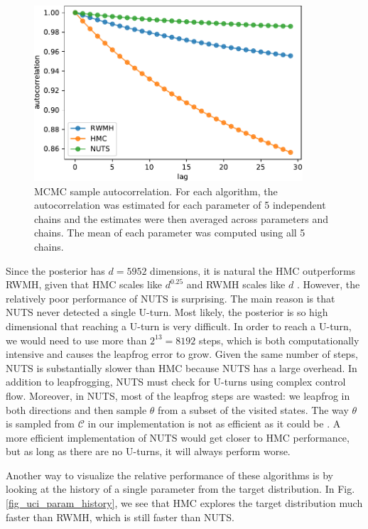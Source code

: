 \documentclass[12pt]{article}
\begin{document}
\begin{figure}[H]
\centering
\includegraphics[width=10cm]{plots/uci_param_autocor.pdf}
\caption{MCMC sample autocorrelation. For each algorithm, the autocorrelation was estimated for each parameter of 5 independent chains and the estimates were then averaged across parameters and chains. The mean of each parameter was computed using all 5 chains.}
\label{fig_uci_param_autocor}
\end{figure}

Since the posterior has $d=5952$ dimensions, it is natural the HMC outperforms RWMH, given that HMC scales like $d^{0.25}$ and RWMH scales like $d$ \cite{hmc_rwmh_scaling}. However, the relatively poor performance of NUTS is surprising. The main reason is that NUTS never detected a single U-turn. Most likely, the posterior is so high dimensional that reaching a U-turn is very difficult. In order to reach a U-turn, we would need to use more than $2^{13} = 8192$ steps, which is both computationally intensive and causes the leapfrog error to grow. Given the same number of steps, NUTS is substantially slower than HMC because NUTS has a large overhead. In addition to leapfrogging, NUTS must check for U-turns using complex control flow. Moreover, in NUTS, most of the leapfrog steps are wasted: we leapfrog in both directions and then sample $\theta$ from a subset of the visited states. The way $\theta$ is sampled from $\mathcal{C}$ in our implementation is not as efficient as it could be \cite{nuts}. A more efficient implementation of NUTS would get closer to HMC performance, but as long as there are no U-turns, it will always perform worse.   

Another way to visualize the relative performance of these algorithms is by looking at the history of a single parameter from the target distribution. In Fig. \ref{fig_uci_param_history}, we see that HMC explores the target distribution much faster than RWMH, which is still faster than NUTS.
\end{document}
